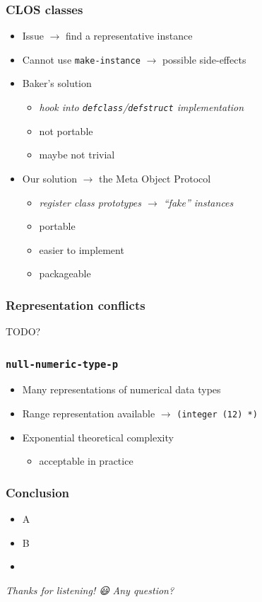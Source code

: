 \documentclass[aspectratio=169]{beamer}
\renewcommand\code[1]{\texttt{#1}}
\newcommand\rarr{\ensuremath{\rightarrow}}
\newcommand\emoji[2][\tiny]{{#1#2}}
\newcommand\plus{{\color{watchOS-blue}\faPlus}}
\newcommand\minus{{\color{watchOS-red}\faMinus}}
\begin{document}
\begin{frame}
  \frametitle{CLOS classes}

  \begin{itemize}
  \item Issue \rarr{} find a representative instance
  \item Cannot use \code{make-instance} \rarr{} possible side-effects
    \pause
  \item Baker's solution
    \begin{itemize}
    \item \emph{hook into \code{defclass}/\code{defstruct} implementation}
    \item[\tiny\minus] not portable
    \item[\tiny\minus] maybe not trivial
    \end{itemize}
  \end{itemize}

  \pause

  \begin{itemize}
  \item Our solution \rarr{} the Meta Object Protocol
    \begin{itemize}
    \item \emph{register class prototypes \rarr{} ``fake'' instances}
    \item[\tiny\plus] portable
    \item[\tiny\plus] easier to implement
    \item[\tiny\plus] packageable
    \end{itemize}
  \end{itemize}
\end{frame}

\begin{frame}
  \frametitle{Representation conflicts}
  TODO?
\end{frame}

\begin{frame}
  \frametitle{\code{null-numeric-type-p}}
  \begin{itemize}
  \item Many representations of numerical data types
  \item Range representation available \rarr{} \code{(integer (12) *)}
  \item Exponential theoretical complexity
    \begin{itemize}
    \item acceptable in practice
    \end{itemize}
  \end{itemize}
\end{frame}

\begin{frame}[standout]
  \frametitle{Conclusion}
  \begin{itemize}
  \item A
  \item B
  \item {}
  \end{itemize}
\end{frame}

\begin{sectionframe}{\it Thanks for listening! \emoji[\normalsize]{😃}}
  \it Any question?
\end{sectionframe}
\end{document}
